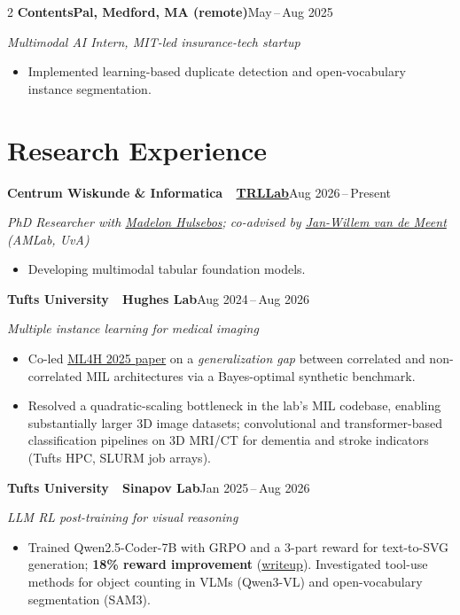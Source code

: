 \documentclass[9pt,letterpaper]{extarticle}
\newcommand{\role}[2]{\noindent\textbf{\small #1}\hfill{\color{meta}\footnotesize #2}\par}
\newcommand{\sub}[1]{\noindent\textit{\footnotesize\color{meta} #1}\par}
\begin{document}
\begin{paracol}{2}
\role{ContentsPal, Medford, MA (remote)}{May\,--\,Aug 2025}
\sub{Multimodal AI Intern, MIT-led insurance-tech startup}
\begin{itemize}
  \item Implemented learning-based duplicate detection and open-vocabulary instance segmentation.
\end{itemize}

\section{Research Experience}

\role{Centrum Wiskunde \& Informatica \,\textemdash\, \href{https://trl-lab.github.io/}{TRLLab}}{Aug 2026\,--\,Present}
\sub{PhD Researcher with \href{https://madelonhulsebos.github.io/}{Madelon Hulsebos}; co-advised by \href{https://jwvdm.github.io/}{Jan-Willem van de Meent} (AMLab, UvA)}
\begin{itemize}
  \item Developing multimodal tabular foundation models.
\end{itemize}

\role{Tufts University \,\textemdash\, Hughes Lab}{Aug 2024\,--\,Aug 2026}
\sub{Multiple instance learning for medical imaging}
\begin{itemize}
  \item Co-led \href{https://arxiv.org/abs/2510.25759}{ML4H 2025 paper} on a \emph{generalization gap} between correlated and non-correlated MIL architectures via a Bayes-optimal synthetic benchmark.
  \item Resolved a quadratic-scaling bottleneck in the lab's MIL codebase, enabling substantially larger 3D image datasets; convolutional and transformer-based classification pipelines on 3D MRI/CT for dementia and stroke indicators (Tufts HPC, SLURM job arrays).
\end{itemize}

\role{Tufts University \,\textemdash\, Sinapov Lab}{Jan 2025\,--\,Aug 2026}
\sub{LLM RL post-training for visual reasoning}
\begin{itemize}
  \item Trained Qwen2.5-Coder-7B with GRPO and a 3-part reward for text-to-SVG generation; \textbf{18\% reward improvement} (\href{https://www.loevliedl.com/static/Portfolio/PDF/RL_for_Visual_Reasoning.pdf}{writeup}). Investigated tool-use methods for object counting in VLMs (Qwen3-VL) and open-vocabulary segmentation (SAM3).
\end{itemize}


\end{paracol}
\end{document}

